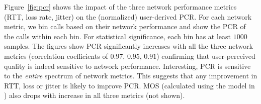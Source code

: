 Figure~\ref{fig:pcr} shows the impact of the three network 
performance metrics (RTT, loss rate, jitter) on the (normalized)
user-derived PCR. 
For each network metric, we bin calls based on their 
network performance and show the PCR of the calls within 
each bin. 
For statistical significance, each bin has at least $1000$ samples. 
The figures show PCR significantly increases with all the three 
network metrics (correlation coefficients of $0.97$, $0.95$, $0.91$) 
confirming that user-perceived quality is indeed sensitive to 
network performance.
Interesting, PCR is sensitive to the {\em entire} spectrum of 
network metrics. This suggests that any improvement in RTT, 
loss or jitter is likely to improve PCR.
MOS (calculated using the model in \cite{cole}) also drops 
with increase in all three metrics (not shown).%





